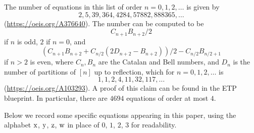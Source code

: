 The number of equations in this list of order $n=0,1,2,\dots$ is given by
$$ 2, 5, 39, 364, 4284, 57882, 888365, \dots$$
(\url{https://oeis.org/A376640}).  The number can be computed to be
$$ C_{n+1} B_{n+2}/2$$
if $n$ is odd, $2$ if $n=0$, and
$$ (C_{n+1} B_{n+2}+ C_{n/2}(2D_{n+2}-B_{n+2}))/2 - C_{n/2} B_{n/2+1}$$
if $n > 2$ is even, where $C_n, B_n$ are the Catalan and Bell numbers, and $D_n$ is the number of partitions of $[n]$ up to reflection, which for $n=0,1,2,\dots$ is
$$ 1, 1, 2, 4, 11, 32, 117, \dots$$
(\url{https://oeis.org/A103293}).  A proof of this claim can be found in the ETP blueprint.  In particular, there are $4694$ equations of order at most $4$.

Below we record some specific equations appearing in this paper, using the alphabet $\mathrm{x}$, $\mathrm{y}$, $\mathrm{z}$, $\mathrm{w}$ in place of $0$, $1$, $2$, $3$ for readability.
\begingroup\allowdisplaybreaks
